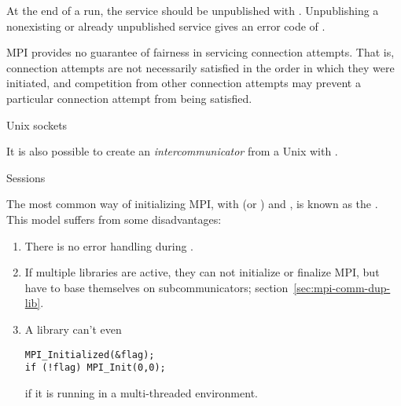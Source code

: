 At the end of a run, the service should be unpublished with
.
Unpublishing a nonexisting or already unpublished service gives an
error code of .

MPI provides no guarantee of fairness in servicing connection
attempts. That is, connection attempts are not necessarily satisfied
in the order in which they were initiated, and competition from other
connection attempts may prevent a particular connection attempt from
being satisfied.

 {Unix sockets}

It is also possible to create an
\emph{intercommunicator} from a Unix
with
.

 {Sessions}
\label{sec:session}

The most common way of initializing MPI,
with  (or ) and ,
is known as the .
This model suffers from some disadvantages:
\begin{enumerate}
\item There is no error handling during .
\item If multiple libraries are active, they can not initialize
  or finalize MPI, but have to base themselves on subcommunicators;
  section~\ref{sec:mpi-comm-dup-lib}.
\item A library can't even 
\begin{lstlisting}
MPI_Initialized(&flag);
if (!flag) MPI_Init(0,0);
\end{lstlisting}
if it is running in a multi-threaded environment.
\end{enumerate}

